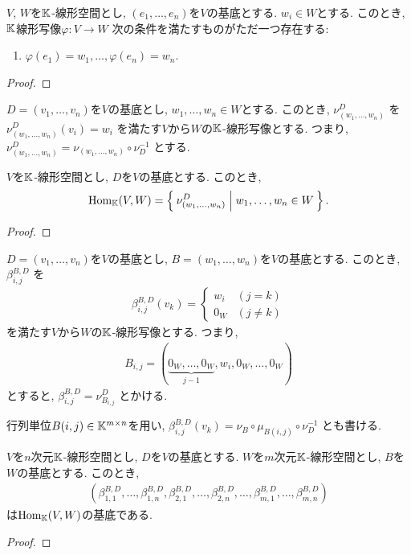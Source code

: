 \begin{cor}
  $V$, $W$を$\mathbb{K}$-線形空間とし,
  $(e_1,\ldots,e_n)$を$V$の基底とする.
  $w_i\in W$とする.
  このとき,
  $\mathbb{K}$線形写像$\varphi\colon V\to W$
  次の条件を満たすものがただ一つ存在する:
  \begin{enumerate}
  \item $\varphi(e_1)=w_1,\ldots,\varphi(e_n)=w_n$.
  \end{enumerate}
\end{cor}
\begin{proof}\end{proof}

$D=(v_1,\ldots,v_n)$を$V$の基底とし,
$w_1,\ldots,w_n\in W$とする.
このとき,
$\nu^{D}_{(w_1,\ldots,w_n)}$
を
$\nu^{D}_{(w_1,\ldots,w_n)}(v_i)=w_i$
を満たす$V$から$W$の$\mathbb{K}$-線形写像とする.
つまり,
$\nu^{D}_{(w_1,\ldots,w_n)}=\nu_{(w_1,\ldots,w_n)}\circ\nu_{D}^{-1}$
とする.
\begin{prop}
$V$を$\mathbb{K}$-線形空間とし,
$D$を$V$の基底とする.
このとき,
\begin{align*}
\operatorname{Hom}_{\mathbb{K}}(V,W)
=
\Set{\nu^{D}_{(w_1,\ldots,w_n)}|w_1,\ldots,w_n\in W}.
\end{align*}
\end{prop}
\begin{proof}\end{proof}

$D=(v_1,\ldots,v_n)$を$V$の基底とし,
$B=(w_1,\ldots,w_n)$を$V$の基底とする.
このとき,
$\beta^{B,D}_{i,j}$
を
\begin{align*}
\beta^{B,D}_{i,j}(v_k)=
\begin{cases}
w_i & (j=k)\\
0_W & (j\neq k)
\end{cases}
\end{align*}
を満たす$V$から$W$の$\mathbb{K}$-線形写像とする.
つまり,
\begin{align*}
B_{i,j}=(\underbrace{0_W,\ldots,0_W}_{j-1},w_i,0_W,\ldots,0_W)
\end{align*}
とすると,
$\beta^{B,D}_{i,j}=\nu^{D}_{B_{i,j}}$
とかける.
\begin{remark}
行列単位$B(i,j)\in \mathbb{K}^{m\times n}$を用い,
$\beta^{B,D}_{i,j}(v_k)=\nu_B\circ \mu_{B(i,j)}\circ \nu_D^{-1}$
とも書ける.
\end{remark}
\begin{prop}
$V$を$n$次元$\mathbb{K}$-線形空間とし,
$D$を$V$の基底とする.
$W$を$m$次元$\mathbb{K}$-線形空間とし,
$B$を$W$の基底とする.
このとき,
\begin{align*}
(\beta^{B,D}_{1,1},\ldots,\beta^{B,D}_{1,n},
\beta^{B,D}_{2,1},\ldots,\beta^{B,D}_{2,n},
\ldots,
\beta^{B,D}_{m,1},\ldots,\beta^{B,D}_{m,n})
\end{align*}
は$\operatorname{Hom}_{\mathbb{K}}(V,W)$の基底である.
\end{prop}
\begin{proof}\end{proof}

